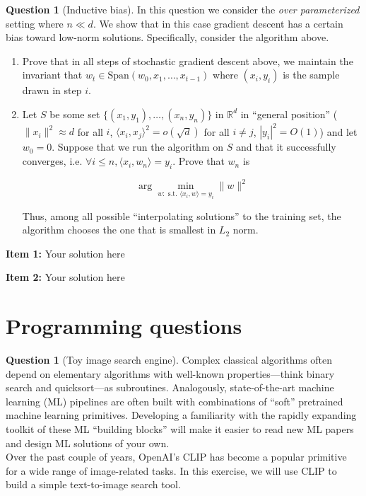 \documentclass{article}
\theoremstyle{definition}
\newtheorem{question}{Question}
\newtheorem{subquestion}{Question}[question]
\newenvironment{solution}{\color{blue}{\textbf{Solution \arabic{question}.\arabic{subquestion}:}\smallskip\newline}}{}
\begin{document}
\begin{subquestion}[Inductive bias]
In this question we consider the \textit{over parameterized} setting where $n\ll d$. We show that in this case gradient descent has a certain bias toward low-norm solutions. Specifically, consider the algorithm above.

\begin{enumerate}

\item Prove that in all steps of stochastic gradient descent above, we maintain the invariant that $w_t \in \mathrm{Span}(w_0,x_1,\ldots,x_{t-1})$ where $(x_i,y_i)$ is the sample drawn in step $i$. 

\item Let $S$ be some set $\{ (x_1,y_1),\ldots, (x_n,y_n) \}$ in $\mathbb{R}^d$ in ``general position'' ( $\| x_i \|^2\approx d$ for all $i$, $\langle x_i,x_j \rangle^2 = o(\sqrt{d})$ for all $i \neq j$, $|y_i|^2 = O(1)$) and let $w_0 = 0$. Suppose that we run the algorithm on $S$ and that it successfully converges, i.e. $\forall i \leq n, \langle x_i, w_n \rangle = y_i$. Prove that $w_n$ is 

$$\arg\min_{w : \text{ s.t. } \langle x_i, w \rangle = y_i} \| w \|^2$$

Thus, among all possible ``interpolating solutions'' to the training set, the algorithm chooses the one that is smallest in $L_2$ norm.

\end{enumerate}
\end{subquestion}


\begin{solution}
\textbf{Item 1:} Your solution here 


\textbf{Item 2:}  Your solution here
\end{solution}

\section*{Programming questions}


\begin{question}[Toy image search engine]
Complex classical algorithms often depend on elementary algorithms with well-known properties---think binary search and quicksort---as subroutines. Analogously, state-of-the-art machine learning (ML) pipelines are often built with combinations of ``soft'' pretrained machine learning primitives. Developing a familiarity with the rapidly expanding toolkit of these ML ``building blocks'' will make it easier to read new ML papers and design ML solutions of your own. \\

Over the past couple of years, OpenAI's CLIP has become a popular primitive for a wide range of image-related tasks. In this exercise, we will use CLIP to build a simple text-to-image search tool. \\
    \end{question}
\end{document}
